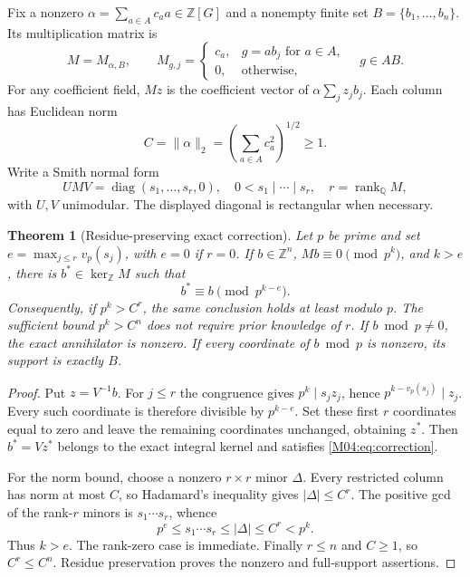 \documentclass[11pt,a4paper,oneside]{report}
\newtheorem{theorem}{Theorem}[section]
\theoremstyle{definition}
\theoremstyle{remark}
\DeclareMathOperator{\rank}{rank}
\newcommand{\Q}{\mathbb Q}
\newcommand{\Z}{\mathbb Z}
\begin{document}
Fix a nonzero $\alpha=\sum_{a\in A}c_a a\in\Z[G]$ and a nonempty
finite set $B=\{b_1,\ldots,b_n\}$. Its multiplication matrix is
\begin{equation}\label{M04:eq:matrix}
M=M_{\alpha,B},\qquad
M_{g,j}=\begin{cases}c_a,&g=ab_j\text{ for }a\in A,\\0,&\text{otherwise},\end{cases}
\quad g\in AB.
\end{equation}
For any coefficient field, $Mz$ is the coefficient vector of
$\alpha\sum_j z_jb_j$. Each column has Euclidean norm
\[
C=\|\alpha\|_2=\left(\sum_{a\in A}c_a^2\right)^{1/2}\ge1.
\]
Write a Smith normal form
\begin{equation}\label{M04:eq:smith}
UMV=\operatorname{diag}(s_1,\ldots,s_r,0),
\quad 0<s_1\mid\cdots\mid s_r,
\quad r=\rank_{\Q}M,
\end{equation}
with $U,V$ unimodular. The displayed diagonal is rectangular when necessary.

\begin{theorem}[Residue-preserving exact correction]\label{M04:thm:correction}
Let $p$ be prime and set $e=\max_{j\le r}v_p(s_j)$, with $e=0$
if $r=0$. If $b\in\Z^n$, $Mb\equiv0\pmod{p^k}$, and $k>e$,
there is $b^*\in\ker_{\Z}M$ such that
\begin{equation}\label{M04:eq:correction}
b^*\equiv b\pmod{p^{k-e}}.
\end{equation}
Consequently, if $p^k>C^r$, the same conclusion holds at least modulo
$p$. The sufficient bound $p^k>C^n$ does not require prior knowledge of $r$.
If $b\bmod p\ne0$, the exact annihilator is nonzero. If every coordinate
of $b\bmod p$ is nonzero, its support is exactly $B$.
\end{theorem}
\begin{proof}
Put $z=V^{-1}b$. For $j\le r$ the congruence gives
$p^k\mid s_jz_j$, hence
$p^{k-v_p(s_j)}\mid z_j$. Every such coordinate is therefore divisible
by $p^{k-e}$. Set these first $r$ coordinates equal to zero and leave
the remaining coordinates unchanged, obtaining $z^*$. Then
$b^*=Vz^*$ belongs to the exact integral kernel and satisfies
\eqref{M04:eq:correction}.

For the norm bound, choose a nonzero $r\times r$ minor $\Delta$.
Every restricted column has norm at most $C$, so Hadamard's inequality
gives $|\Delta|\le C^r$. The positive gcd of the rank-$r$ minors is
$s_1\cdots s_r$, whence
\[
p^e\le s_1\cdots s_r\le |\Delta|\le C^r<p^k.
\]
Thus $k>e$. The rank-zero case is immediate. Finally $r\le n$ and
$C\ge1$, so $C^r\le C^n$. Residue preservation proves the nonzero and
full-support assertions.
\end{proof}
\end{document}

